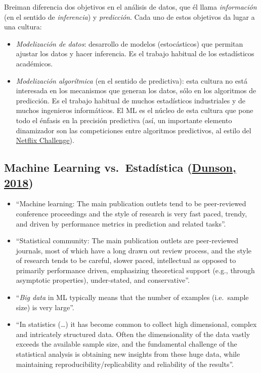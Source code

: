 \documentclass[
  spanish,
]{book}
\theoremstyle{break}
\theoremstyle{definition}
\theoremstyle{definition}
\theoremstyle{definition}
\theoremstyle{definition}
\theoremstyle{remark}
\begin{document}
Breiman diferencia dos objetivos en el análisis de datos, que él llama \emph{información} (en el sentido de \emph{inferencia}) y \emph{predicción}.
Cada uno de estos objetivos da lugar a una cultura:

\begin{itemize}
\item
  \emph{Modelización de datos}: desarrollo de modelos (estocásticos) que permitan ajustar los datos y hacer inferencia. Es el trabajo habitual de los estadísticos académicos.
\item
  \emph{Modelización algorítmica} (en el sentido de predictiva): esta cultura no está interesada en los mecanismos que generan los datos, sólo en los algoritmos de predicción. Es el trabajo habitual de muchos estadísticos industriales y de muchos ingenieros informáticos. El ML es el núcleo de esta cultura que pone todo el énfasis en la precisión predictiva (así, un importante elemento dinamizador
  son las competiciones entre algoritmos predictivos, al estilo del \href{https://en.wikipedia.org/wiki/Netflix_Prize}{Netflix Challenge}).
\end{itemize}

\hypertarget{machine-learning-vs.-estaduxedstica-dunson2018statistics}{%
\subsection{\texorpdfstring{Machine Learning vs.~Estadística (\protect\hyperlink{ref-dunson2018statistics}{Dunson, 2018})}{Machine Learning vs.~Estadística (Dunson, 2018)}}\label{machine-learning-vs.-estaduxedstica-dunson2018statistics}}

\begin{itemize}
\item
  ``Machine learning: The main publication outlets tend to be peer-reviewed conference proceedings and the style of research is very fast paced, trendy, and driven by performance metrics in prediction and related tasks''.
\item
  ``Statistical community: The main publication outlets are peer-reviewed journals, most of which have a long drawn out review process, and the style of research tends to be careful, slower paced, intellectual as opposed to primarily performance driven, emphasizing theoretical support (e.g., through asymptotic properties), under-stated, and conservative''.
\item
  ``\emph{Big data} in ML typically means that the number of examples (i.e.~sample size) is very large''.
\item
  ``In statistics (\ldots) it has become common to collect high dimensional, complex and intricately structured data. Often the dimensionality of the data vastly exceeds the available sample size, and the fundamental challenge of the statistical analysis is obtaining new insights from these huge data, while maintaining reproducibility/replicability and reliability of the results''.
\end{itemize}
\end{document}
